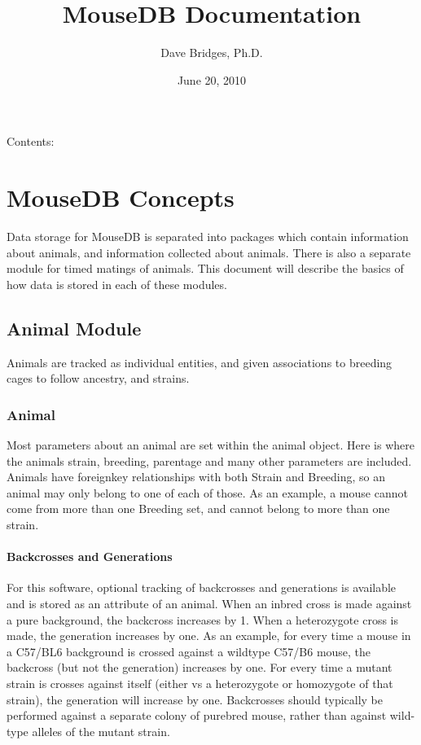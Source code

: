 \documentclass[letterpaper,10pt,english]{sphinxmanual}
\title{MouseDB Documentation}
\date{June 20, 2010}
\author{Dave Bridges, Ph.D.}
\begin{document}
\maketitle
\tableofcontents
{}\label{index::doc}


Contents:


\chapter{MouseDB Concepts}
\label{concepts:welcome-to-mousedb-s-documentation}\label{concepts::doc}\label{concepts:mousedb-concepts}
Data storage for MouseDB is separated into packages which contain information about animals, and information collected about animals.  There is also a separate module for timed matings of animals.  This document will describe the basics of how data is stored in each of these modules.


\section{Animal Module}
\label{concepts:animal-module}
Animals are tracked as individual entities, and given associations to breeding cages to follow ancestry, and strains.


\subsection{Animal}
\label{concepts:animal}
Most parameters about an animal are set within the animal object.  Here is where the animals strain, breeding, parentage and many other parameters are included.  Animals have foreignkey relationships with both Strain and Breeding, so an animal may only belong to one of each of those.  As an example, a mouse cannot come from more than one Breeding set, and cannot belong to more than one strain.


\subsubsection{Backcrosses and Generations}
\label{concepts:backcrosses-and-generations}
For this software, optional tracking of backcrosses and generations is available and is stored as an attribute of an animal.  When an inbred cross is made against a pure background, the backcross increases by 1.  When a heterozygote cross is made, the generation increases by one.  As an example, for every time a mouse in a C57/BL6 background is crossed against a wildtype C57/B6 mouse, the backcross (but not the generation) increases by one.  For every time a mutant strain is crosses against itself (either vs a heterozygote or homozygote of that strain), the generation will increase by one.  Backcrosses should typically be performed against a separate colony of purebred mouse, rather than against wild-type alleles of the mutant strain.
\end{document}
